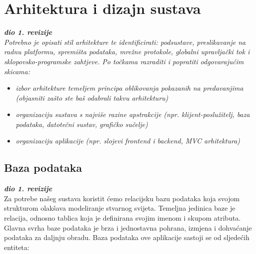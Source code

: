 \chapter{Arhitektura i dizajn sustava}
		
		\textbf{\textit{dio 1. revizije}}\\

		\textit{ Potrebno je opisati stil arhitekture te identificirati: podsustave, preslikavanje na radnu platformu, spremišta podataka, mrežne protokole, globalni upravljački tok i sklopovsko-programske zahtjeve. Po točkama razraditi i popratiti odgovarajućim skicama:}
	\begin{itemize}
		\item 	\textit{izbor arhitekture temeljem principa oblikovanja pokazanih na predavanjima (objasniti zašto ste baš odabrali takvu arhitekturu)}
		\item 	\textit{organizaciju sustava s najviše razine apstrakcije (npr. klijent-poslužitelj, baza podataka, datotečni sustav, grafičko sučelje)}
		\item 	\textit{organizaciju aplikacije (npr. slojevi frontend i backend, MVC arhitektura) }		
	\end{itemize}

			

				
		\section{Baza podataka}
			
			\textbf{\textit{dio 1. revizije}}\\			
		
			
				\noindent Za potrebe našeg sustava koristit ćemo relacijsku bazu podataka koja svojom strukturom olakšava modeliranje stvarnog svijeta. Temeljna jedinica baze je relacija, odnosno tablica koja je definirana svojim imenom i skupom atributa. Glavna svrha baze podataka je brza i jednostavna pohrana, izmjena i dohvaćanje podataka za daljnju obradu. Baza podataka ove aplikacije sastoji se od sljedećih entiteta:
				

